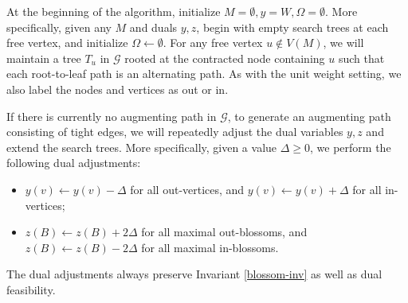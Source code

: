 At the beginning of the algorithm, initialize $M = \emptyset, y= W, \Omega = \emptyset$. More specifically, given any $M$ and duals $y, z$, begin with empty search trees at each free vertex, and initialize $\Omega\leftarrow \emptyset$. For any free  vertex $u\notin V(M)$, we will maintain a tree $T_u$ in $\mathcal{G}$ rooted at the contracted node containing $u$ such that each root-to-leaf path is an alternating path. As with the unit weight setting, we also label the nodes and vertices as out or in.

If there is currently no augmenting path in $\mathcal{G}$, to generate an augmenting path consisting of tight edges, we will repeatedly adjust the dual variables $y, z$ and extend the search trees. More specifically, given a value $\Delta\geq 0$, we perform the following dual adjustments:
\begin{itemize}
	\item $y(v)\leftarrow y(v) - \Delta$ for all out-vertices, and $y(v)\leftarrow y(v) + \Delta$ for all in-vertices;
	\item $z(B)\leftarrow z(B) + 2\Delta$ for all maximal out-blossoms, and $z(B)\leftarrow z(B) - 2\Delta$ for all maximal in-blossoms.
\end{itemize}

\begin{observation}
	The dual adjustments always preserve Invariant \ref{blossom-inv} as well as dual feasibility.
\end{observation}

